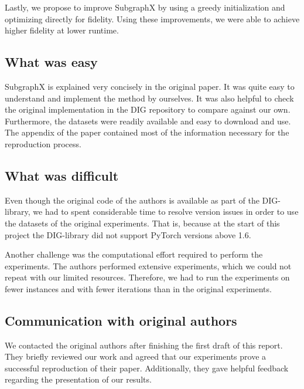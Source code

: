 Lastly, we propose to improve SubgraphX by using a greedy initialization and optimizing directly for fidelity. Using these improvements, we were able to achieve higher fidelity at lower runtime.

\subsection{What was easy}
SubgraphX is explained very concisely in the original paper. It was quite easy to understand and implement the method by ourselves. 
It was also helpful to check the original implementation in the DIG repository to compare against our own. 
Furthermore, the datasets were readily available and easy to download and use. 
The appendix of the paper contained most of the information necessary for the reproduction process.


\subsection{What was difficult}
Even though the original code of the authors is available as part of the DIG-library, we had to spent considerable time to resolve version issues in order to use the datasets of the original experiments. That is, because at the start of this project the DIG-library did not support PyTorch versions above 1.6.

Another challenge was the computational effort required to perform the experiments.
The authors performed extensive experiments, which we could not repeat with our limited resources.
Therefore, we  had to run the experiments on fewer instances and with fewer iterations than in the original experiments.

\subsection{Communication with original authors}
We contacted the original authors after finishing the first draft of this report. They briefly reviewed our work and agreed that our experiments prove a successful reproduction of their paper. Additionally, they gave helpful feedback regarding the presentation of our results.






